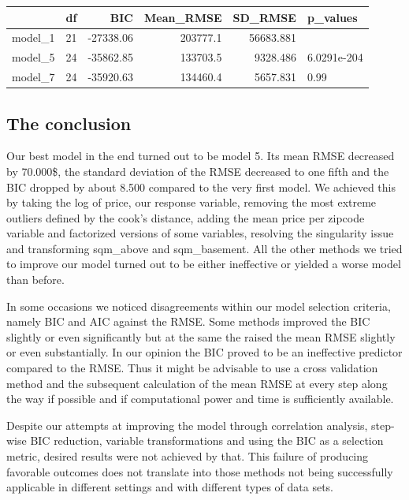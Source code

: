 \documentclass[table]{article}
\begin{document}
\begin{table}[H]
\centering
\begin{tabular}{l|r|r|r|r|l}
\hline
  & df & BIC & Mean\_RMSE & SD\_RMSE & p\_values\\
\hline
model\_1 & 21 & -27338.06 & 203777.1 & 56683.881 & \\
\hline
model\_5 & 24 & -35862.85 & 133703.5 & 9328.486 & 6.0291e-204\\
\hline
model\_7 & 24 & -35920.63 & 134460.4 & 5657.831 & 0.99\\
\hline
\end{tabular}
\end{table}

\subsection{The conclusion}\label{the-conclusion}

Our best model in the end turned out to be model 5. Its mean RMSE
decreased by 70.000\$, the standard deviation of the RMSE decreased to
one fifth and the BIC dropped by about 8.500 compared to the very first
model. We achieved this by taking the log of price, our response
variable, removing the most extreme outliers defined by the cook's
distance, adding the mean price per zipcode variable and factorized
versions of some variables, resolving the singularity issue and
transforming sqm\_above and sqm\_basement. All the other methods we
tried to improve our model turned out to be either ineffective or
yielded a worse model than before.

In some occasions we noticed disagreements within our model selection
criteria, namely BIC and AIC against the RMSE. Some methods improved the
BIC slightly or even significantly but at the same the raised the mean
RMSE slightly or even substantially. In our opinion the BIC proved to be
an ineffective predictor compared to the RMSE. Thus it might be
advisable to use a cross validation method and the subsequent
calculation of the mean RMSE at every step along the way if possible and
if computational power and time is sufficiently available.

Despite our attempts at improving the model through correlation
analysis, step-wise BIC reduction, variable transformations and using
the BIC as a selection metric, desired results were not achieved by
that. This failure of producing favorable outcomes does not translate
into those methods not being successfully applicable in different
settings and with different types of data sets.
\end{document}
